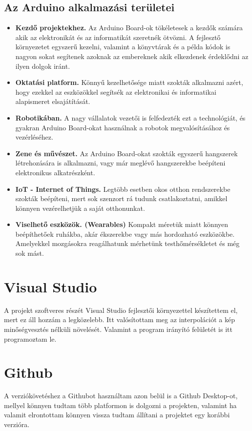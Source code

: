 \documentclass[]{thesis-ekf}
\theoremstyle{definition}
\theoremstyle{remark}
\begin{document}
	\subsection{Az Arduino alkalmazási területei}
	\begin{itemize}
		\item \textbf{Kezdő projektekhez.} Az Arduino Board-ok tökéletesek a kezdők számára akik az elektronikát és az informatikát szeretnék ötvözni. A fejlesztő környezetet egyszerű kezelni, valamint a könyvtárak és a példa kódok is nagyon sokat segítenek azoknak az embereknek akik elkezdenek érdeklődni az ilyen dolgok iránt.
		\item \textbf{Oktatási platform.} Könnyű kezelhetősége miatt szokták alkalmazni azért, hogy ezekkel az eszközökkel segítsék az elektronikai és informatikai alapismeret elsajátítását.
		\item \textbf{Robotikában.} A nagy vállalatok vezetői is felfedezték ezt a technológiát, és gyakran Arduino Board-okat használnak a robotok megvalósításához és vezérléséhez.
		\item \textbf{Zene és művészet.} Az Arduino Board-okat szokták egyszerű hangszerek létrehozására is alkalmazni, vagy már meglévő hangszerekbe beépíteni elektronikus alkatrészként.
		\item \textbf{IoT - Internet of Things.} Legtöbb esetben okos otthon rendszerekbe szokták beépíteni, mert sok szenzort rá tudunk csatlakoztatni, amikkel könnyen vezérelhetjük a saját otthonunkat. 
		\item \textbf{Viselhető eszközök. (Wearables)} Kompakt méretük miatt könnyen beépíthetőek ruhákba, akár ékszerekbe vagy más hordozható eszközökbe. Amelyekkel mozgásokra reagálhatunk mérhetünk testhőmérsékletet és még sok mást.
	\end{itemize}
	\section{Visual Studio}
	A projekt szoftveres részét Visual Studio\cite{visual-studio} fejlesztői környezettel készítettem el, mert ez áll hozzám a legközelebb. Itt valósítottam meg az interpolációt a kép minőségvesztés nélküli növelését. Valamint a program irányító felületét is itt programoztam le. 
	\section{Github}
	A verziókövetéshez a Githubot\cite{github} használtam azon belül is a Github Desktop-ot, mellyel könnyen tudtam több platformon is dolgozni a projekten, valamint ha valamit elrontottam könnyen vissza tudtam állítani a projektet egy korábbi verzióra.
\end{document}
